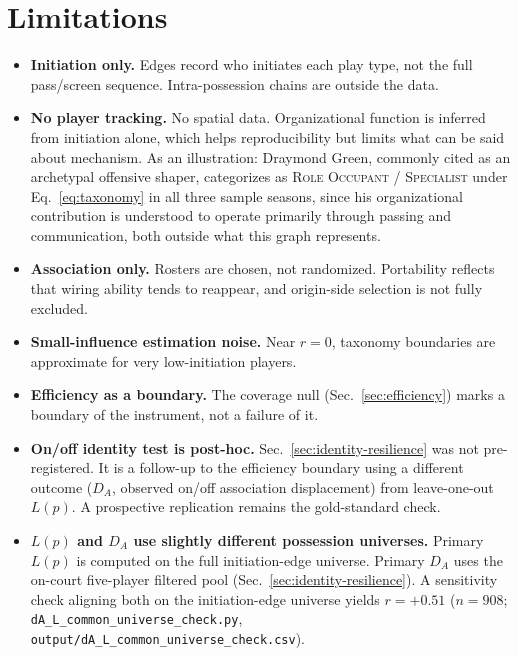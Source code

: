\documentclass[11pt]{article}
\newcommand{\load}{\ensuremath{L}} %
\newcommand{\resid}{\ensuremath{r}} %
\begin{document}
\section{Limitations}
\label{sec:limitations}

\begin{itemize}[leftmargin=1.4em,itemsep=0.2em]
 \item \textbf{Initiation only.} Edges record who initiates each play type, not the full
 pass/screen sequence. Intra-possession chains are outside the data.
 \item \textbf{No player tracking.} No spatial data. Organizational function is inferred from
 initiation alone, which helps reproducibility but limits what can be said about mechanism. As
 an illustration: Draymond Green, commonly cited as an archetypal offensive shaper,
 categorizes as \textsc{Role Occupant / Specialist} under Eq.~\eqref{eq:taxonomy} in all three
 sample seasons, since his organizational contribution is understood to operate primarily
 through passing and communication, both outside what this graph represents.
 \item \textbf{Association only.} Rosters are chosen, not randomized. Portability reflects
 that wiring ability tends to reappear, and origin-side selection is not fully excluded.
 \item \textbf{Small-influence estimation noise.} Near $\resid=0$, taxonomy boundaries are
 approximate for very low-initiation players.
 \item \textbf{Efficiency as a boundary.} The coverage null (Sec.~\ref{sec:efficiency}) marks
 a boundary of the instrument, not a failure of it.
 \item \textbf{On/off identity test is post-hoc.} Sec.~\ref{sec:identity-resilience} was not
 pre-registered. It is a follow-up to the efficiency boundary using a different outcome
 ($D_A$, observed on/off association displacement) from leave-one-out $\load(p)$. A
 prospective replication remains the gold-standard check.
 \item \textbf{$\load(p)$ and $D_A$ use slightly different possession universes.} Primary
 $\load(p)$ is computed on the full initiation-edge universe. Primary $D_A$ uses the on-court
 five-player filtered pool (Sec.~\ref{sec:identity-resilience}). A sensitivity check aligning
 both on the initiation-edge universe yields $r=+0.51$ ($n=908$;
 \texttt{dA\_L\_common\_universe\_check.py},
 \texttt{output/dA\_L\_common\_universe\_check.csv}).

\end{itemize}
\end{document}
